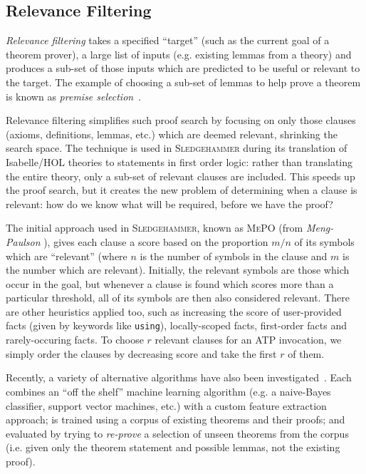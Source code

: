 \subsection{Relevance Filtering}
\label{sec:relevance}

\emph{Relevance filtering} takes a specified ``target'' (such as the current
goal of a theorem prover), a large list of inputs (e.g. existing lemmas from a
theory) and produces a sub-set of those inputs which are predicted to be useful
or relevant to the target. The example of choosing a sub-set of lemmas to help
prove a theorem is known as \emph{premise
  selection}~\cite{kuhlwein2012overview}.

Relevance filtering simplifies such proof search by focusing on only those
clauses (axioms, definitions, lemmas, etc.) which are deemed relevant, shrinking
the search space. The technique is used in \textsc{Sledgehammer} during its
translation of Isabelle/HOL theories to statements in first order logic: rather
than translating the entire theory, only a sub-set of relevant clauses are
included. This speeds up the proof search, but it creates the new problem of
determining when a clause is relevant: how do we know what will be required,
before we have the proof?

The initial approach used in \textsc{Sledgehammer}, known as \textsc{MePO} (from
\emph{Meng-Paulson} \cite{meng2009lightweight}), gives each clause a score based
on the proportion $m / n$ of its symbols which are ``relevant'' (where $n$ is
the number of symbols in the clause and $m$ is the number which are relevant).
Initially, the relevant symbols are those which occur in the goal, but whenever
a clause is found which scores more than a particular threshold, all of its
symbols are then also considered relevant. There are other heuristics applied
too, such as increasing the score of user-provided facts (given by keywords
like \texttt{using}), locally-scoped facts, first-order facts and
rarely-occuring facts. To choose $r$ relevant clauses for an ATP invocation, we
simply order the clauses by decreasing score and take the first $r$ of them.

Recently, a variety of alternative algorithms have also been
investigated~\cite{kuhlwein2013mash,hoder2011sine,urban2013blistr,gauthier2015premise,alama2014premise,carlson1999snow,kaliszyk2014machinelearner,kaliszyk2015femalecop}.
Each combines an ``off the shelf'' machine learning algorithm (e.g. a
naive-Bayes classifier, support vector machines, etc.) with a custom feature
extraction approach; is trained using a corpus of existing theorems and their
proofs; and evaluated by trying to \emph{re-prove} a selection of unseen
theorems from the corpus (i.e. given only the theorem statement and possible
lemmas, not the existing proof).

